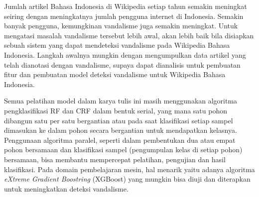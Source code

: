Jumlah artikel Bahasa Indonesia di Wikipedia setiap tahun semakin meningkat
seiring dengan meningkatnya jumlah pengguna internet di Indonesia.
Semakin banyak pengguna, kemungkinan vandalisme juga semakin meningkat.
Untuk mengatasi masalah vandalisme tersebut lebih awal, akan lebih baik bila
disiapkan sebuah sistem yang dapat mendeteksi vandalisme pada Wikipedia
Bahasa Indonesia.
Langkah awalnya mungkin dengan mengumpulkan data artikel yang telah dianotasi
dengan vandalisme, supaya dapat dianalisis untuk pembuatan fitur dan pembuatan
model deteksi vandalisme untuk Wikipedia Bahasa Indonesia.

Semua pelatihan model dalam karya tulis ini masih menggunakan algoritma
pengklasifikasi RF dan CRF dalam bentuk serial, yang mana satu pohon dibangun
satu per satu bergantian atau pada saat klasifikasi setiap sampel dimasukan ke
dalam pohon secara bergantian untuk mendapatkan kelasnya.
Penggunaan algoritma paralel, seperti dalam pembentukan dua atau empat pohon
bersamaan dan klasifikasi sampel (pengumpulan kelas di setiap pohon)
bersamaan, bisa membantu mempercepat pelatihan, pengujian dan hasil
klasifikasi.
Pada domain pembelajaran mesin, hal menarik yaitu adanya algoritma
\textit{eXtreme Gradient Boostring} (XGBoost) \cite{chen2016xgboost} yang
mungkin bisa diuji dan diterapkan untuk meningkatkan deteksi vandalisme.

